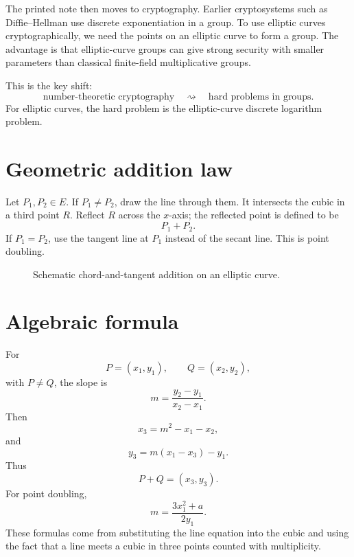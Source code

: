 The printed note then moves to cryptography.  Earlier cryptosystems such as Diffie--Hellman use discrete exponentiation in a group.  To use elliptic curves cryptographically, we need the points on an elliptic curve to form a group.  The advantage is that elliptic-curve groups can give strong security with smaller parameters than classical finite-field multiplicative groups.

This is the key shift:
\[
  \text{number-theoretic cryptography}\quad\rightsquigarrow\quad\text{hard problems in groups}.
\]
For elliptic curves, the hard problem is the elliptic-curve discrete logarithm problem.

\section{Geometric addition law}

Let \(P_1,P_2\in E\).  If \(P_1\neq P_2\), draw the line through them.  It intersects the cubic in a third point \(R\).  Reflect \(R\) across the \(x\)-axis; the reflected point is defined to be
\[
  P_1+P_2.
\]
If \(P_1=P_2\), use the tangent line at \(P_1\) instead of the secant line.  This is point doubling.

\begin{figure}[H]
\centering
{}
\caption{Schematic chord-and-tangent addition on an elliptic curve.}
\end{figure}

\section{Algebraic formula}

For
\[
  P=(x_1,y_1),\qquad Q=(x_2,y_2),
\]
with \(P\neq Q\), the slope is
\[
  m=\frac{y_2-y_1}{x_2-x_1}.
\]
Then
\[
  x_3=m^2-x_1-x_2,
\]
and
\[
  y_3=m(x_1-x_3)-y_1.
\]
Thus
\[
  P+Q=(x_3,y_3).
\]
For point doubling,
\[
  m=\frac{3x_1^2+a}{2y_1}.
\]
These formulas come from substituting the line equation into the cubic and using the fact that a line meets a cubic in three points counted with multiplicity.

